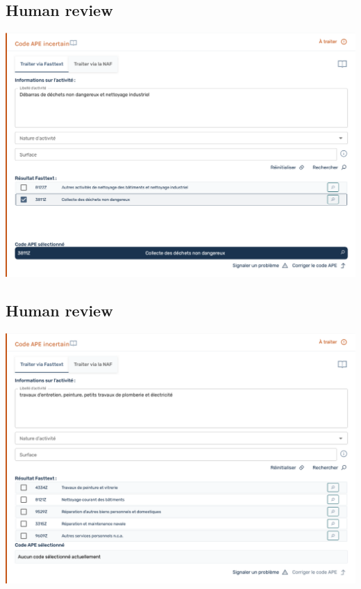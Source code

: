 \documentclass[
  letterpaper,
  DIV=11,
  numbers=noendperiod]{scrartcl}
\begin{document}
\subsection{Human review}\label{human-review}

\begin{center}
\includegraphics{../img/reprise_gestionnaire_ape.png}
\end{center}

\subsection{Human review}\label{human-review-1}

\begin{center}
\includegraphics{../img/reprise_gestionnaire_manque_contexte.png}
\end{center}
\end{document}
